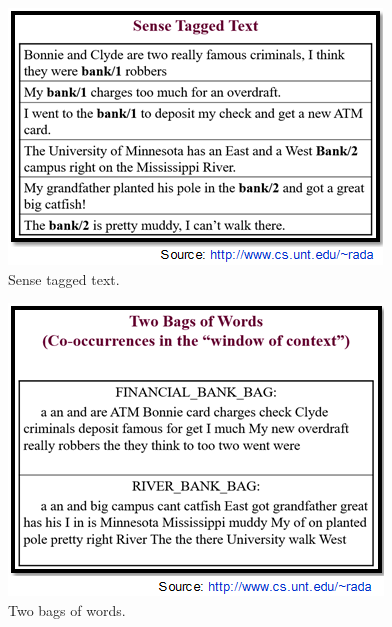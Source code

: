 \begin{figure}[tbh]
	\begin{center}
		\includegraphics[width=\columnwidth]{Union_Background_Chart_sup1}
	\end{center}
	\caption{Sense tagged text.}
\end{figure}
\begin{figure}[tbh]
	\begin{center}
		\includegraphics[width=\columnwidth]{Union_Background_Chart_sup2}
	\end{center}
	\caption{Two bags of words.}
\end{figure}
